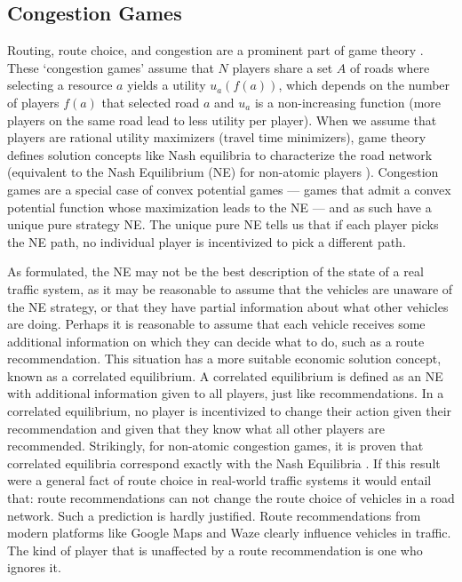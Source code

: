
\subsection{Congestion Games}

Routing, route choice, and congestion are a prominent part of game theory \cite{rosenthal1973class}. These `congestion games' assume that $N$ players share a set $A$ of roads where selecting a resource $a$ yields a utility $u_a(f(a))$, which depends on the number of players $f(a)$ that selected road $a$ and $u_a$ is a non-increasing function (more players on the same road lead to less utility per player). When we assume that players are rational utility maximizers (travel time minimizers), game theory defines solution concepts like Nash equilibria to characterize the road network (equivalent to the Nash Equilibrium (NE) for non-atomic players \cite{wie1998relationship}). Congestion games are a special case of convex potential games \cite{monderer1996potential} --- games that admit a convex potential function whose maximization leads to the NE --- and as such have a unique pure strategy NE. The unique pure NE tells us that if each player picks the NE path, no individual player is incentivized to pick a different path. 

As formulated, the NE may not be the best description of the state of a real traffic system, as it may be reasonable to assume that the vehicles are unaware of the NE strategy, or that they have partial information about what other vehicles are doing. Perhaps it is reasonable to assume that each vehicle receives some additional information on which they can decide what to do, such as a route recommendation. This situation has a more suitable economic solution concept, known as a correlated equilibrium. A correlated equilibrium is defined as an NE with additional information given to all players, just like recommendations. In a correlated equilibrium, no player is incentivized to change their action given their recommendation and given that they know what all other players are recommended. Strikingly, for non-atomic congestion games, it is proven that correlated equilibria correspond exactly with the Nash Equilibria \cite{koessler2024correlated}. If this result were a general fact of route choice in real-world traffic systems it would entail that: route recommendations can not change the route choice of vehicles in a road network. Such a prediction is hardly justified. Route recommendations from modern platforms like Google Maps and Waze clearly influence vehicles in traffic. The kind of player that is unaffected by a route recommendation is one who ignores it. 

